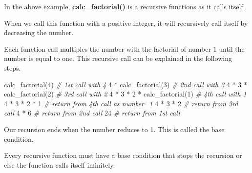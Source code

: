 \documentclass[11pt]{article}
\newenvironment{Shaded}{}{}
\newcommand{\DecValTok}[1]{\textcolor[rgb]{0.25,0.63,0.44}{{#1}}}
\newcommand{\CommentTok}[1]{\textcolor[rgb]{0.38,0.63,0.69}{\textit{{#1}}}}
\newcommand{\NormalTok}[1]{{#1}}
\newcommand{\OperatorTok}[1]{\textcolor[rgb]{0.40,0.40,0.40}{{#1}}}
\begin{document}
    In the above example, \textbf{calc\_factorial()} is a recursive
functions as it calls itself.

When we call this function with a positive integer, it will recursively
call itself by decreasing the number.

Each function call multiples the number with the factorial of number 1
until the number is equal to one. This recursive call can be explained
in the following steps.

\begin{Shaded}
\begin{Highlighting}[]
\NormalTok{calc_factorial(}\DecValTok{4}\NormalTok{)              }\CommentTok{# 1st call with 4}
\DecValTok{4} \OperatorTok{*}\NormalTok{ calc_factorial(}\DecValTok{3}\NormalTok{)          }\CommentTok{# 2nd call with 3}
\DecValTok{4} \OperatorTok{*} \DecValTok{3} \OperatorTok{*}\NormalTok{ calc_factorial(}\DecValTok{2}\NormalTok{)      }\CommentTok{# 3rd call with 2}
\DecValTok{4} \OperatorTok{*} \DecValTok{3} \OperatorTok{*} \DecValTok{2} \OperatorTok{*}\NormalTok{ calc_factorial(}\DecValTok{1}\NormalTok{)  }\CommentTok{# 4th call with 1}
\DecValTok{4} \OperatorTok{*} \DecValTok{3} \OperatorTok{*} \DecValTok{2} \OperatorTok{*} \DecValTok{1}                  \CommentTok{# return from 4th call as number=1}
\DecValTok{4} \OperatorTok{*} \DecValTok{3} \OperatorTok{*} \DecValTok{2}                      \CommentTok{# return from 3rd call}
\DecValTok{4} \OperatorTok{*} \DecValTok{6}                          \CommentTok{# return from 2nd call}
\DecValTok{24}                             \CommentTok{# return from 1st call}
\end{Highlighting}
\end{Shaded}

    Our recursion ends when the number reduces to 1. This is called the base
condition.

Every recursive function must have a base condition that stops the
recursion or else the function calls itself infinitely.
\end{document}
